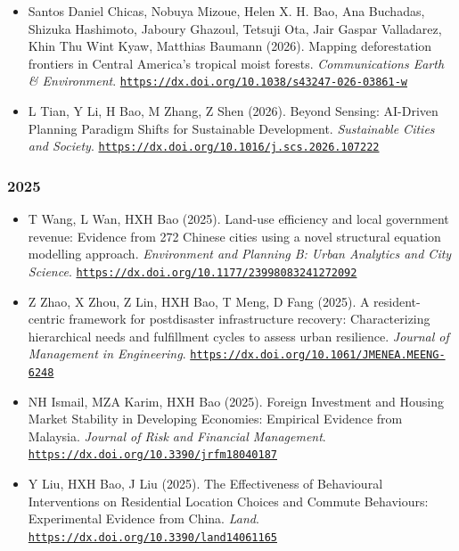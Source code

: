 \documentclass[11pt,a4paper]{article}
\providecommand{\tightlist}{%
  \setlength{\itemsep}{1pt}\setlength{\parskip}{0pt}}
\begin{document}
\begin{itemize}
  in Shanghai, China. \emph{Land Use Policy}.
  \href{https://dx.doi.org/10.1016/j.landusepol.2025.107825}{\nolinkurl{https://dx.doi.org/10.1016/j.landusepol.2025.107825}}
\item
  Santos Daniel Chicas, Nobuya Mizoue, Helen X. H. Bao, Ana Buchadas,
  Shizuka Hashimoto, Jaboury Ghazoul, Tetsuji Ota, Jair Gaspar
  Valladarez, Khin Thu Wint Kyaw, Matthias Baumann (2026). Mapping
  deforestation frontiers in Central America's tropical moist forests.
  \emph{Communications Earth \& Environment}.
  \href{https://dx.doi.org/10.1038/s43247-026-03861-w}{\nolinkurl{https://dx.doi.org/10.1038/s43247-026-03861-w}}
\item
  L Tian, Y Li, H Bao, M Zhang, Z Shen (2026). Beyond Sensing: AI-Driven
  Planning Paradigm Shifts for Sustainable Development.
  \emph{Sustainable Cities and Society}.
  \href{https://dx.doi.org/10.1016/j.scs.2026.107222}{\nolinkurl{https://dx.doi.org/10.1016/j.scs.2026.107222}}
\end{itemize}

\subsubsection{2025}\label{section-1}

\begin{itemize}
\tightlist
\item
  T Wang, L Wan, HXH Bao (2025). Land-use efficiency and local
  government revenue: Evidence from 272 Chinese cities using a novel
  structural equation modelling approach. \emph{Environment and Planning
  B: Urban Analytics and City Science}.
  \href{https://dx.doi.org/10.1177/23998083241272092}{\nolinkurl{https://dx.doi.org/10.1177/23998083241272092}}
\item
  Z Zhao, X Zhou, Z Lin, HXH Bao, T Meng, D Fang (2025). A
  resident-centric framework for postdisaster infrastructure recovery:
  Characterizing hierarchical needs and fulfillment cycles to assess
  urban resilience. \emph{Journal of Management in Engineering}.
  \href{https://dx.doi.org/10.1061/JMENEA.MEENG-6248}{\nolinkurl{https://dx.doi.org/10.1061/JMENEA.MEENG-6248}}
\item
  NH Ismail, MZA Karim, HXH Bao (2025). Foreign Investment and Housing
  Market Stability in Developing Economies: Empirical Evidence from
  Malaysia. \emph{Journal of Risk and Financial Management}.
  \href{https://dx.doi.org/10.3390/jrfm18040187}{\nolinkurl{https://dx.doi.org/10.3390/jrfm18040187}}
\item
  Y Liu, HXH Bao, J Liu (2025). The Effectiveness of Behavioural
  Interventions on Residential Location Choices and Commute Behaviours:
  Experimental Evidence from China. \emph{Land}.
  \href{https://dx.doi.org/10.3390/land14061165}{\nolinkurl{https://dx.doi.org/10.3390/land14061165}}
\end{itemize}
\end{document}
